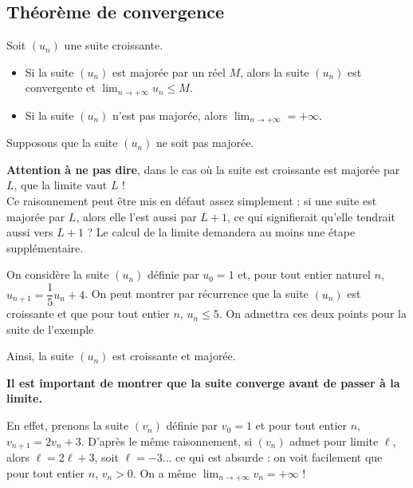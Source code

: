 \documentclass[11pt,fleqn, openany]{book} %
\begin{document}
\subsection{Théorème de convergence}

\begin{theorem} Soit $(u_n)$ une suite croissante.
\begin{itemize}
\item Si la suite $(u_n)$ est majorée par un réel $M$, alors la suite $(u_n)$ est convergente et $\displaystyle \lim_{n \to +\infty} u_n \leqslant M$.
\item Si la suite $(u_n)$ n'est pas majorée, alors $\displaystyle \lim_{n \to +\infty} = +\infty$.
\end{itemize} \end{theorem}


\begin{demonstration} Supposons que la suite $(u_n)$ ne soit pas majorée. 

\vskip50pt
\end{demonstration}


\textbf{Attention à ne pas dire}, dans le cas où la suite est croissante est majorée par $L$, que la limite vaut $L$ ! \\
Ce raisonnement peut être mis en défaut assez simplement : si une suite est majorée par $L$, alors elle l'est aussi par $L+1$, ce qui signifierait qu'elle tendrait aussi vers $L+1$ ? Le calcul de la limite demandera au moins une étape supplémentaire.


\begin{example} On considère la suite $(u_n)$ définie par $u_0=1$ et, pour tout entier naturel $n$, $u_{n+1}=\dfrac{1}{5}u_n+4$. On peut montrer par récurrence que la suite $(u_n)$ est croissante et que pour tout entier $n$, $u_n \leqslant 5$. On admettra ces deux points pour la suite de l'exemple

Ainsi, la suite $(u_n)$ est croissante et majorée. 

\vskip170pt

\end{example}

\textbf{ Il est important de montrer que la suite converge avant de passer à la limite.} 
 
 En effet, prenons la suite $(v_n)$ définie par $v_0=1$ et pour tout entier $n$, $v_{n+1}=2v_n+3$. D'après le même raisonnement, si $(v_n)$ admet pour limite $\ell$, alors $\ell=2\ell+3$, soit $\ell=-3$... ce qui est absurde : on voit facilement que pour tout entier $n$, $v_n>0$. On a même $\displaystyle \lim_{n \to +\infty} v_n = +\infty$ !
\end{document}
